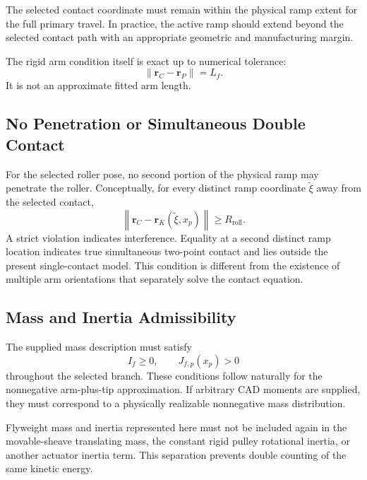 \documentclass[11pt]{report}
\numberwithin{equation}{section}
\begin{document}
The selected contact coordinate must remain within the physical ramp extent for
the full primary travel. In practice, the active ramp should extend beyond the
selected contact path with an appropriate geometric and manufacturing margin.

The rigid arm condition itself is exact up to numerical tolerance:
\begin{equation}
    \boxed{
    \|\bm r_C-\bm r_P\|=L_f.
    }
\end{equation}
It is not an approximate fitted arm length.

\subsection{No Penetration or Simultaneous Double Contact}

For the selected roller pose, no second portion of the physical ramp may
penetrate the roller. Conceptually, for every distinct ramp coordinate
\(\tilde\xi\) away from the selected contact,
\begin{equation}
    \boxed{
    \left\|
        \bm r_C
        -
        \bm r_K(\tilde\xi,x_p)
    \right\|
    \ge
    R_{\mathrm{roll}}.
    }
    \label{eq:appB_nonpenetration}
\end{equation}
A strict violation indicates interference. Equality at a second distinct ramp
location indicates true simultaneous two-point contact and lies outside the
present single-contact model. This condition is different from the existence
of multiple arm orientations that separately solve the contact equation.

\subsection{Mass and Inertia Admissibility}

The supplied mass description must satisfy
\begin{equation}
    \boxed{
    I_f\ge0,
    \qquad
    J_{f,p}(x_p)>0
    }
    \label{eq:appB_mass_admissible}
\end{equation}
throughout the selected branch. These conditions follow naturally for the
nonnegative arm-plus-tip approximation. If arbitrary CAD moments are supplied,
they must correspond to a physically realizable nonnegative mass distribution.

Flyweight mass and inertia represented here must not be included again in the
movable-sheave translating mass, the constant rigid pulley rotational inertia,
or another actuator inertia term. This separation prevents double counting of
the same kinetic energy.
\end{document}
